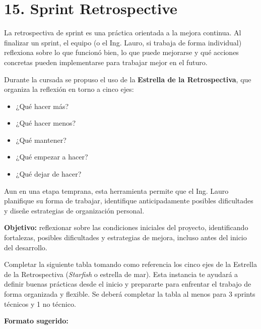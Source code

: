 \documentclass[
11pt, %
]{charter}
\begin{document}
\section{15. Sprint Retrospective}    
\label{sec:sprint_retro}

La retrospectiva de sprint es una práctica orientada a la mejora continua. Al finalizar un sprint, el equipo (o el Ing. Lauro, si trabaja de forma individual) reflexiona sobre lo que funcionó bien, lo que puede mejorarse y qué acciones concretas pueden implementarse para trabajar mejor en el futuro.

Durante la cursada se propuso el uso de la \textbf{Estrella de la Retrospectiva}, que organiza la reflexión en torno a cinco ejes:

\begin{itemize}
\item  ¿Qué hacer más?
\item  ¿Qué hacer menos?
\item  ¿Qué mantener?
\item  ¿Qué empezar a hacer?
\item  ¿Qué dejar de hacer?
\end{itemize}

Aun en una etapa temprana, esta herramienta permite que el Ing. Lauro planifique su forma de trabajar, identifique anticipadamente posibles dificultades y diseñe estrategias de organización personal.

\textbf{Objetivo:} reflexionar sobre las condiciones iniciales del proyecto, identificando fortalezas, posibles dificultades y estrategias de mejora, incluso antes del inicio del desarrollo.


Completar la siguiente tabla tomando como referencia los cinco ejes de la Estrella de la Retrospectiva (\emph{Starfish} o estrella de mar). Esta instancia te ayudará a definir buenas prácticas desde el inicio y prepararte para enfrentar el trabajo de forma organizada y flexible. Se deberá completar la tabla al menos para 3 sprints técnicos y 1 no técnico.

\textbf{Formato sugerido:}
\end{document}
